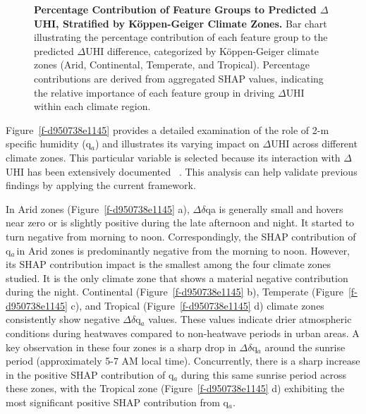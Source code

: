 \bgroup
{}
\begin{figure*}[!htbp]
\centering \makeatletter{}
\makeatother 
\caption{{\textbf{Percentage Contribution of Feature Groups to Predicted \ensuremath{\Delta }UHI, Stratified by K{\"{o}}ppen-Geiger Climate Zones.} Bar chart illustrating the percentage contribution of each feature group to the predicted \ensuremath{\Delta }UHI difference, categorized by K{\"{o}}ppen-Geiger climate zones (Arid, Continental, Temperate, and Tropical). Percentage contributions are derived from aggregated SHAP values, indicating the relative importance of each feature group in driving \ensuremath{\Delta }UHI within each climate region.}}
\label{f-46952309aae5}
\end{figure*}
\egroup
Figure~\ref{f-d950738e1145}   provides a detailed examination of the role of 2-m specific humidity (q\ensuremath{_{a}}) and illustrates its varying impact on \ensuremath{\Delta }UHI across different climate zones. This particular variable is selected because its interaction with \ensuremath{\Delta }UHI has been extensively documented\unskip~\cite{2755510:33598930,2755510:33598952,2755510:33598945,2755510:33598947} . This analysis can help validate previous findings by applying the current framework. 

In Arid zones (Figure~\ref{f-d950738e1145} a), \ensuremath{\Delta }\ensuremath{\delta }qa is generally small and hovers near zero or is slightly positive during the late afternoon and night. It started to turn negative from morning to noon. Correspondingly, the SHAP contribution of q\ensuremath{_{a\ }}in Arid zones is predominantly negative from the morning to noon. However, its SHAP contribution impact is the smallest among the four climate zones studied. It is the only climate zone that shows a material negative contribution during the night. Continental (Figure~\ref{f-d950738e1145} b), Temperate (Figure~\ref{f-d950738e1145} c), and Tropical (Figure~\ref{f-d950738e1145} d) climate zones consistently show negative \ensuremath{\Delta }\ensuremath{\delta }q\ensuremath{_{a}} values. These values indicate drier atmospheric conditions during heatwaves compared to non-heatwave periods in urban areas. A key observation in these four zones is a sharp drop in \ensuremath{\Delta }\ensuremath{\delta }q\ensuremath{_{a}} around the sunrise period (approximately 5-7 AM local time). Concurrently, there is a sharp increase in the positive SHAP contribution of q\ensuremath{_{a}} during this same sunrise period across these zones, with the Tropical zone (Figure~\ref{f-d950738e1145} d) exhibiting the most significant positive SHAP contribution from q\ensuremath{_{a}}.


